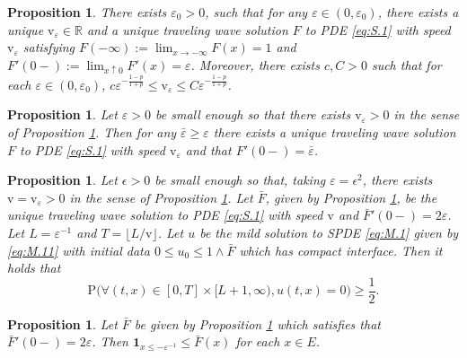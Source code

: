 \documentclass[12pt,a4paper]{amsart}
\numberwithin{equation}{section}
\theoremstyle{plain}
\newtheorem{proposition}[theorem]{Proposition}
\theoremstyle{remark}
\begin{document}
\begin{proposition} \label{thm:S.2}
    There exists $\varepsilon_0>0$, such that for any $\varepsilon \in (0, \varepsilon_0)$, there exists a unique $\mathrm v_{\varepsilon} \in \mathbb R$ and a unique traveling wave solution $F$ to PDE \eqref{eq:S.1} with speed $\mathrm v_\varepsilon$ satisfying $F(-\infty):= \lim_{x\to -\infty} F(x) = 1$ and $F'(0-):= \lim_{x\uparrow 0}F'(x) = \varepsilon$. 
    Moreover, there exists $c,C>0$ such that for each $\varepsilon \in (0,\varepsilon_0)$, $c \varepsilon^{-\frac{1-p}{1+p}} \leq \mathrm v_{\varepsilon} \leq C \varepsilon^{-\frac{1-p}{1+p}}$.
\end{proposition}

\begin{proposition} \label{thm:S.25}
	\color{blue}
	Let $\varepsilon >0$ be small enough so that there exists $\mathrm v_{\varepsilon}>0$ in the sense of Proposition \ref{thm:S.2}.
	Then for any $\bar \varepsilon \geq \varepsilon$ there exists a unique traveling wave solution $F$ to PDE \eqref{eq:S.1} with speed $\mathrm v_\varepsilon$ and that $F'(0-) = \bar\varepsilon$.
\end{proposition}
	
\begin{proposition} \label{thm:S.7}
	\color{blue}
	Let $\epsilon> 0$ be small enough so that, taking $\varepsilon = \epsilon^{2}$,	there exists $\mathrm v = \mathrm v_{\varepsilon}>0$ in the sense of Proposition \ref{thm:S.2}.
	Let $\bar F$, given by Proposition \ref{thm:S.25}, be the unique traveling wave solution to PDE \eqref{eq:S.1} with speed $\mathrm v$ and $\bar F'(0-) = 2 \varepsilon$.	
	Let $L = \varepsilon^{-1}$ and $T= \lfloor L/\mathrm v\rfloor$.
	Let $u$ be the mild solution to SPDE \eqref{eq:M.1} given by \eqref{eq:M.11} with initial data $0\leq u_0\leq 1\wedge \bar F$ which has compact interface. 
	Then it holds that
\[
	\mathrm P\big( \forall (t,x)\in [0,T] \times [ L + 1,\infty), u(t,x) = 0\big) \geq \frac{1}{2}.
\]
\end{proposition}

\begin{proposition} \label{thm:S.8}
	Let $\bar F$ be given by Proposition \ref{thm:S.7} which satisfies that $\bar F'(0-) = 2\varepsilon$. 
	Then $\mathbf 1_{x\leq -\varepsilon^{-1}}\leq \bar F(x)$ for each $x\in E$.
\end{proposition}
\end{document}
